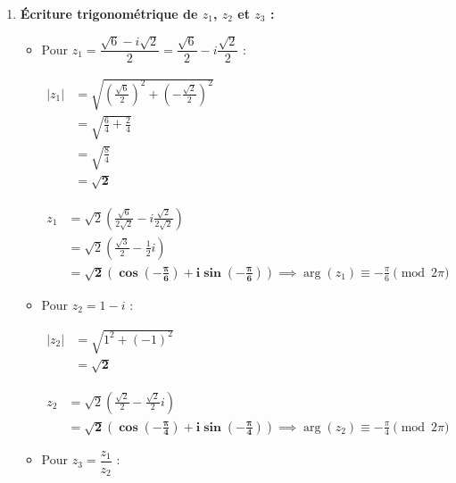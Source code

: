 \documentclass[12pt,a4paper]{article}
\begin{document}
\begin{enumerate}
    \item \textbf{Écriture trigonométrique de $z_1$, $z_2$ et $z_3$ :}
    
    \begin{itemize}
        \item Pour $z_1 = \dfrac{\sqrt{6} - i\sqrt{2}}{2} = \dfrac{\sqrt{6}}{2} - i\dfrac{\sqrt{2}}{2}$ :
        
        $
        \begin{aligned}
            |z_1| &= \sqrt{\left(\frac{\sqrt{6}}{2}\right)^2 + \left(-\frac{\sqrt{2}}{2}\right)^2}\\
            &= \sqrt{\frac{6}{4} + \frac{2}{4}}\\
            &= \sqrt{\frac{8}{4}}\\
            &= \mathbf{\sqrt{2}}
        \end{aligned}
        $
        
        $
        \begin{aligned}
            z_1 &= \sqrt{2}\left(\frac{\sqrt{6}}{2\sqrt{2}} - i\frac{\sqrt{2}}{2\sqrt{2}}\right)\\
            &= \sqrt{2}\left(\frac{\sqrt{3}}{2} - \frac{1}{2}i\right)\\
            &= \mathbf{\sqrt{2}\left(\cos\left(-\frac{\pi}{6}\right) + i\sin\left(-\frac{\pi}{6}\right)\right)} \implies \arg(z_1) \equiv -\frac{\pi}{6} \pmod{2\pi}
        \end{aligned}
        $
        
        \item Pour $z_2 = 1 - i$ :
        
        $
        \begin{aligned}
            |z_2| &= \sqrt{1^2 + (-1)^2}\\
            &= \mathbf{\sqrt{2}}
        \end{aligned}
        $
        
        $
        \begin{aligned}
            z_2 &= \sqrt{2}\left(\frac{\sqrt{2}}{2} - \frac{\sqrt{2}}{2}i\right)\\
            &= \mathbf{\sqrt{2}\left(\cos\left(-\frac{\pi}{4}\right) + i\sin\left(-\frac{\pi}{4}\right)\right)} \implies \arg(z_2) \equiv -\frac{\pi}{4} \pmod{2\pi}
        \end{aligned}
        $
        
        \item Pour $z_3 = \dfrac{z_1}{z_2}$ :
        

\end{itemize}
\end{enumerate}
\end{document}
